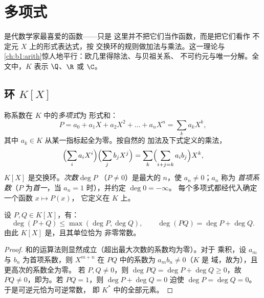 \chapter{多项式}\label{ch:b1:poly}

是代数学家最喜爱的函数——只是
这里并不把它们当作函数，而是把它们看作
不定元 $X$ 上的形式表达式，按
交换环的规则做加法与乘法。这一理论与
\cref{ch:b1:arith}惊人地平行：欧几里得除法、与贝祖关系、
不可约元与唯一分解。全文中，$K$
表示 $\Q$、$\R$ 或 $\C$。

\section{环 $K[X]$}

\begin{definition}[多项式，次数]\label{def:b1:poly:def}
称系数在 $K$ 中的\emph{多项式}为
形式和：
\[
P = a_0 + a_1 X + a_2 X^2 + \dots + a_n X^n
= \sum_{k} a_k X^k,
\]
其中 $a_k \in K$ 从某一指标起全为零。按自然的
加法及下式定义的乘法，
\[
\Bigl(\sum_i a_i X^i\Bigr)\Bigl(\sum_j b_j X^j\Bigr)
= \sum_k \Bigl(\sum_{i+j=k} a_i b_j\Bigr) X^k,
\]
 $K[X]$ 是交换环。\emph{次数}$\deg P$
（$P \neq 0$）是最大的 $n$，使 $a_n \neq 0$；$a_n$ 称为
\emph{首项系数}（$P$ 为\emph{首一}，当 $a_n = 1$ 时），并约定 $\deg 0 = -\infty$。
每个多项式都经代入确定一个函数 $x \mapsto P(x)$，
它定义在 $K$ 上。
\end{definition}

\begin{proposition}[次数的运算法则；整环]\label{prop:b1:poly:degree}
设 $P, Q \in K[X]$，有：
\[
\deg(P + Q) \leq \max(\deg P, \deg Q),
\qquad
\deg(PQ) = \deg P + \deg Q .
\]
由此 $K[X]$ 是，且其单位恰为
非零常数。
\end{proposition}

\begin{proof}
和的运算法则显然成立（超出最大次数的系数均为零）。对于
乘积，设 $a_m$ 与 $b_n$ 为首项系数，则
$X^{m+n}$ 在 $PQ$ 中的系数为 $a_m b_n \neq 0$（$K$ 是
域，故为），且更高次的系数全为零。
若 $P, Q \neq 0$，则 $\deg PQ = \deg P + \deg Q \geq 0$，故 $PQ \neq
0$，即为。若 $PQ = 1$，则 $\deg P + \deg Q = 0$ 迫使
$\deg P = \deg Q = 0$。于是可逆元恰为可逆常数，
即 $K^*$ 中的全部元素。
\end{proof}

